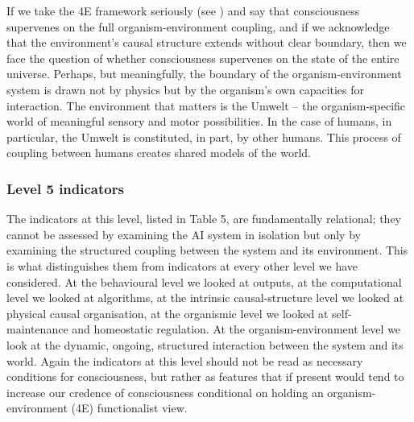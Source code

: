 \documentclass[11pt, a4paper, onecolumn, gdm]{google}
\begin{document}
If we take the 4E framework seriously (see ) and say that consciousness supervenes on the full organism-environment coupling, and if we acknowledge that the environment's causal structure extends without clear boundary, then we face the question of whether consciousness supervenes on the state of the entire universe.
Perhaps, but meaningfully, the boundary of the organism-environment system is drawn not by physics but by the organism's own capacities for interaction.
The environment that matters is the Umwelt -- the organism-specific world of meaningful sensory and motor possibilities.
In the case of humans, in particular, the Umwelt is constituted, in part, by other humans.
This process of coupling between humans creates shared models of the world.

\subsubsection*{Level 5 indicators}\label{level-5-indicators}

The indicators at this level, listed in Table 5, are fundamentally relational; they cannot be assessed by examining the AI system in isolation but only by examining the structured coupling between the system and its environment.
This is what distinguishes them from indicators at every other level we have considered.
At the behavioural level we looked at outputs, at the computational level we looked at algorithms, at the intrinsic causal-structure level we looked at physical causal organisation, at the organismic level we looked at self-maintenance and homeostatic regulation.
At the organism-environment level we look at the dynamic, ongoing, structured interaction between the system and its world.
Again the indicators at this level should not be read as necessary conditions for consciousness, but rather as features that if present would tend to increase our credence of consciousness conditional on holding an organism-environment (4E) functionalist view.
\end{document}
